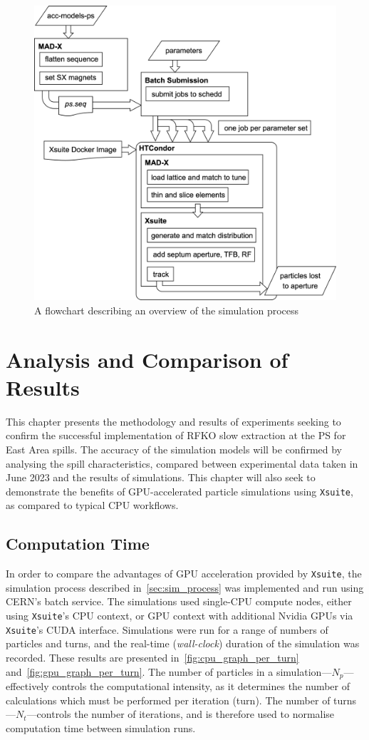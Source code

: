 \documentclass[a4paper,twoside,11pt]{report}
\begin{document}
\begin{figure}[h]
  \centering
  \includegraphics*[width=0.85\linewidth]{simulation-flowchart.png}
  \caption{A flowchart describing an overview of the simulation process}\label{fig:flowchart}
\end{figure}


\chapter{Analysis and Comparison of Results}
This chapter presents the methodology and results of experiments seeking to confirm the successful implementation of RFKO slow extraction at the PS for East Area spills. The accuracy of the simulation models will be confirmed by analysing the spill characteristics, compared between experimental data taken in June 2023 and the results of simulations. This chapter will also seek to demonstrate the benefits of GPU-accelerated particle simulations using \verb|Xsuite|, as compared to typical CPU workflows.


\section{Computation Time}

In order to compare the advantages of GPU acceleration provided by \verb|Xsuite|, the simulation process described in~\autoref{sec:sim_process} was implemented and run using CERN's batch service. The simulations used single-CPU compute nodes, either using \verb|Xsuite|'s CPU context, or GPU context with additional Nvidia GPUs via \verb|Xsuite|'s CUDA interface. Simulations were run for a range of numbers of particles and turns, and the real-time (\textit{wall-clock}) duration of the simulation was recorded. These results are presented in~\autoref{fig:cpu_graph_per_turn} and~\autoref{fig:gpu_graph_per_turn}. The number of particles in a simulation---$N_p$---effectively controls the computational intensity, as it determines the number of calculations which must be performed per iteration (turn). The number of turns---$N_t$---controls the number of iterations, and is therefore used to normalise computation time between simulation runs.
\end{document}
